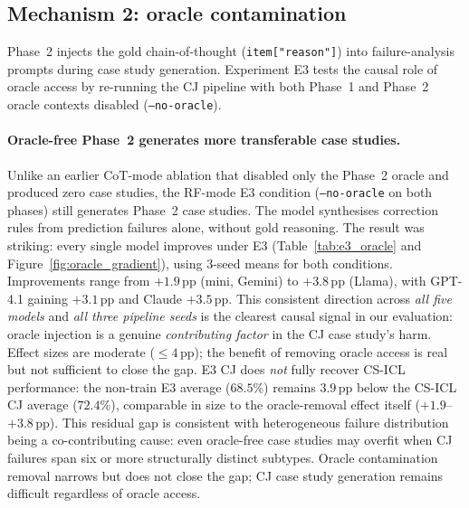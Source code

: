 \documentclass{article}
\begin{document}
\subsection{Mechanism 2: oracle contamination}
\label{sec:oracle}

Phase~2 injects the gold chain-of-thought (\texttt{item["reason"]}) into failure-analysis
prompts during case study generation.
Experiment E3 tests the causal role of oracle access by re-running the CJ pipeline with
both Phase~1 and Phase~2 oracle contexts disabled (\texttt{--no-oracle}).

\paragraph{Oracle-free Phase~2 generates more transferable case studies.}
Unlike an earlier CoT-mode ablation that disabled only the Phase~2 oracle and produced zero
case studies, the RF-mode E3 condition (\texttt{--no-oracle} on both phases) still generates
Phase~2 case studies. The model synthesises correction rules from prediction failures alone,
without gold reasoning.
The result was striking: every single model improves under E3 (Table~\ref{tab:e3_oracle} and
Figure~\ref{fig:oracle_gradient}), using 3-seed means for both conditions.
Improvements range from $+1.9$\,pp (mini, Gemini) to $+3.8$\,pp (Llama), with GPT-4.1 gaining
$+3.1$\,pp and Claude $+3.5$\,pp.
This consistent direction across \emph{all five models} and \emph{all three pipeline seeds}
is the clearest causal signal in our evaluation: oracle injection is a genuine
\emph{contributing factor} in the CJ case study's harm.
Effect sizes are moderate ($\leq 4$\,pp); the benefit of removing oracle access is real
but not sufficient to close the gap.
E3 CJ does \emph{not} fully recover CS-ICL performance: the non-train E3 average
($68.5\%$) remains $3.9$\,pp below the CS-ICL CJ average ($72.4\%$), comparable in size to
the oracle-removal effect itself ($+1.9$--$+3.8$\,pp).
This residual gap is consistent with heterogeneous failure distribution being a co-contributing
cause: even oracle-free case studies may overfit when CJ failures span six or more structurally
distinct subtypes.
Oracle contamination removal narrows but does not close the gap; CJ case study generation
remains difficult regardless of oracle access.
\end{document}
